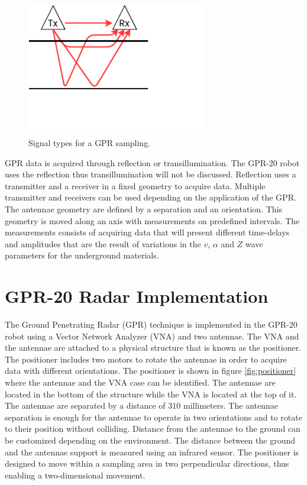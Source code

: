 \documentclass{article}
\begin{document}
\begin{figure}
    \centering
    \includegraphics[width=0.7\textwidth, trim = 0cm 1cm 2cm 0cm, clip]{images/theoretical/GPR20_surveying_waves.pdf}
    \caption{Signal types for a GPR sampling.}
    \label{fig:waves}
\end{figure}

GPR data is acquired through reflection or transillumination. The GPR-20 robot uses the reflection thus transillumination will not be discussed. Reflection uses a transmitter and a receiver in a fixed geometry to acquire data. Multiple transmitter and receivers can be used depending on the application of the GPR. The antennae geometry are defined by a separation and an orientation. This geometry is moved along an axis with measurements on predefined intervals. The measurements consists of acquiring data that will present different time-delays and amplitudes that are the result of variations in the $v$, $\alpha$ and $Z$ wave parameters for the underground materials.

\section{GPR-20 Radar Implementation}
The Ground Penetrating Radar (GPR) technique is implemented in the GPR-20 robot using a Vector Network Analyzer (VNA) and two antennae. The VNA and the antennae are attached to a physical structure that is known as the positioner. The positioner includes two motors to rotate the antennae in order to acquire data with different orientations. The positioner is shown in figure \ref{fig:positioner} where the antennae and the VNA case can be identified. The antennae are located in the bottom of the structure while the VNA is located at the top of it. The antennae are separated by a distance of 310 millimeters. The antennae separation is enough for the antennae to operate in two orientations and to rotate to their position without colliding. Distance from the antennae to the ground can be customized depending on the environment. The distance between the ground and the antennae support is measured using an infrared sensor. The positioner is designed to move within a sampling area in two perpendicular directions, thus enabling a two-dimensional movement.
\end{document}
